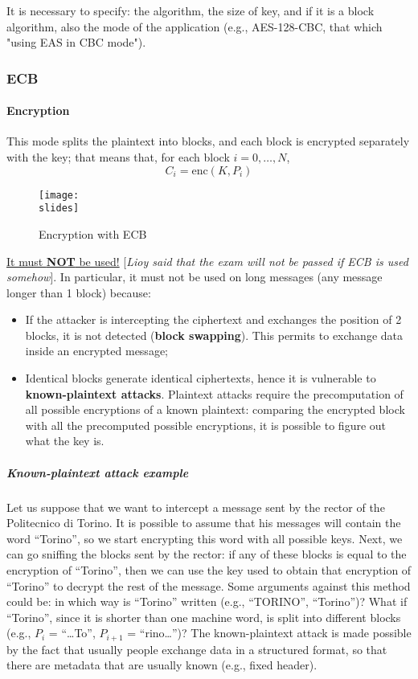 It is necessary to specify:
the algorithm, the size of key, and if it is a block algorithm, also the mode of the application (e.g., AES-128-CBC, that which "using EAS in CBC mode").


\subsubsection{ECB}
\paragraph*{Encryption}
This mode splits the plaintext into blocks, and each block is encrypted separately with the key;
that means that, for each block \(i = 0, \ldots, N\),
\[
    C_i = \text{enc}(K, P_i)
\]
\begin{figure}[h]
    \centering
    \texttt{[image: \\slides]}
    \caption{Encryption with ECB}
\end{figure}

\underline{It must \textbf{NOT} be used!} [\textit{Lioy said that the exam will not be passed if ECB is used somehow}].
In particular, it must not be used on long messages (any message longer than 1 block) because:
\begin{itemize}
    \item If the attacker is intercepting the ciphertext and exchanges the position of 2 blocks, it is not detected (\textbf{block swapping}). This permits to exchange data inside an encrypted message;
    \item Identical blocks generate identical ciphertexts, hence it is vulnerable to \textbf{known-plaintext attacks}. Plaintext attacks require the precomputation of all possible encryptions of a known plaintext: comparing the encrypted block with all the precomputed possible encryptions, it is possible to figure out what the key is.
\end{itemize}

\subparagraph*{Known-plaintext attack example}
Let us suppose that we want to intercept a message sent by the rector of the Politecnico di Torino. It is possible
to assume that his messages will contain the word “Torino”, so we start encrypting this word with all possible
keys. Next, we can go sniffing the blocks sent by the rector: if any of these blocks is equal to the encryption
of “Torino”, then we can use the key used to obtain that encryption of “Torino” to decrypt the rest of the
message. Some arguments against this method could be: in which way is “Torino” written (e.g., “TORINO”,
“Torino”)? What if “Torino”, since it is shorter than one machine word, is split into different blocks (e.g., \(P_i\) =
“…To”, \(P_{i+1}\) = “rino…”)? The known-plaintext attack is made possible by the fact that usually people exchange
data in a structured format, so that there are metadata that are usually known (e.g., fixed header).


